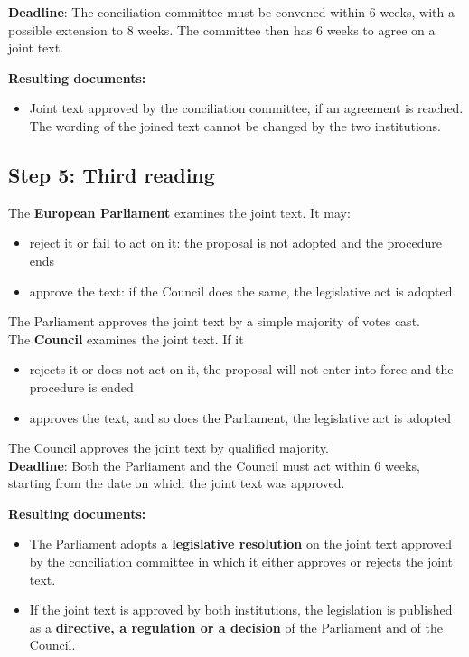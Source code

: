\textbf{Deadline}: The conciliation committee must be convened within 6 weeks, with a possible extension to 8 weeks. The committee then has 6 weeks to agree on a joint text.

\textbf{Resulting documents:}
\begin{itemize}
\item Joint text approved by the conciliation committee, if an agreement is reached. The wording of the joined text cannot be changed by the two institutions.
\end{itemize}

\clearpage
\subsection{Step 5: Third reading}

The \textbf{European Parliament} examines the joint text. It may:
\begin{itemize}
\item reject it or fail to act on it: the proposal is not adopted and the procedure ends
\item approve the text: if the Council does the same, the legislative act is adopted
\end{itemize}

The Parliament approves the joint text by a simple majority of votes cast. \\

The \textbf{Council} examines the joint text. If it
\begin{itemize}
\item rejects it or does not act on it, the proposal will not enter into force and the procedure is ended
\item approves the text, and so does the Parliament, the legislative act is adopted
\end{itemize}

The Council approves the joint text by qualified majority. \\

\textbf{Deadline}: Both the Parliament and the Council must act within 6 weeks, starting from the date on which the joint text was approved.

\textbf{Resulting documents:}
\begin{itemize}
	\item The Parliament adopts a \textbf{legislative resolution }on the joint text approved by the conciliation committee in which it either approves or rejects the joint text.
	\item If the joint text is approved by both institutions, the legislation is published as a \textbf{directive, a regulation or a decision} of the Parliament and of the Council.
\end{itemize}


